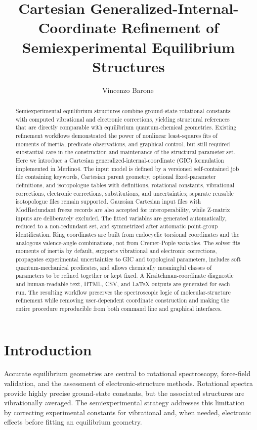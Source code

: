 \documentclass[journal=jctcce,manuscript=article,maxauthors=999]{achemso}
\title{Cartesian Generalized-Internal-Coordinate Refinement of Semiexperimental Equilibrium Structures}
\author{Vincenzo Barone\,\orcidlink{0000-0001-6420-4107}}
\affiliation{INSTM, via G. Giusti 9, 50121 Firenze, Italy}
\begin{document}
\begin{abstract}
Semiexperimental equilibrium structures combine ground-state rotational constants with computed vibrational and electronic corrections, yielding structural references that are directly comparable with equilibrium quantum-chemical geometries. Existing refinement workflows demonstrated the power of nonlinear least-squares fits of moments of inertia, predicate observations, and graphical control, but still required substantial care in the construction and maintenance of the structural parameter set. Here we introduce a Cartesian generalized-internal-coordinate (GIC) formulation implemented in Merlino4. The input model is defined by a versioned self-contained job file containing keywords, Cartesian parent geometry, optional fixed-parameter definitions, and isotopologue tables with definitions, rotational constants, vibrational corrections, electronic corrections, substitutions, and uncertainties; separate reusable isotopologue files remain supported. Gaussian Cartesian input files with ModRedundant freeze records are also accepted for interoperability, while Z-matrix inputs are deliberately excluded. The fitted variables are generated automatically, reduced to a non-redundant set, and symmetrized after automatic point-group identification. Ring coordinates are built from endocyclic torsional coordinates and the analogous valence-angle combinations, not from Cremer-Pople variables. The solver fits moments of inertia by default, supports vibrational and electronic corrections, propagates experimental uncertainties to GIC and topological parameters, includes soft quantum-mechanical predicates, and allows chemically meaningful classes of parameters to be refined together or kept fixed. A Kraitchman-coordinate diagnostic and human-readable text, HTML, CSV, and \LaTeX{} outputs are generated for each run. The resulting workflow preserves the spectroscopic logic of molecular-structure refinement while removing user-dependent coordinate construction and making the entire procedure reproducible from both command line and graphical interfaces.
\end{abstract}

\section{Introduction}

Accurate equilibrium geometries are central to rotational spectroscopy, force-field validation, and the assessment of electronic-structure methods. Rotational spectra provide highly precise ground-state constants, but the associated structures are vibrationally averaged. The semiexperimental strategy addresses this limitation by correcting experimental constants for vibrational and, when needed, electronic effects before fitting an equilibrium geometry.
\end{document}
